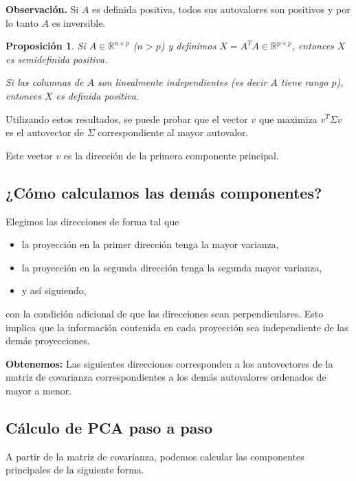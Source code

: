 \documentclass[a4paper]{article}
\newtheorem{prop}{Proposici\'on}
\newcommand{\R}{{\mathbb R}}
\begin{document}
\textbf{Observación.} Si $A$ es definida positiva, todos sus autovalores son positivos y por lo tanto $A$ es inversible.

\begin{prop}
Si $A \in \R^{n \times p}$ ($n > p$) y definimos $X = A^T A \in \R^{p \times p}$, entonces $X$ es semidefinida positiva.

Si las columnas de $A$ son linealmente independientes (es decir $A$ tiene rango $p$), entonces $X$ es definida positiva.
\end{prop}


Utilizando estos resultados, se puede probar que el vector $v$ que maximiza $v^T \Sigma v$ es el autovector de $\Sigma$ correspondiente al mayor autovalor.

Este vector $v$ es la dirección de la primera componente principal.

\subsection{¿Cómo calculamos las demás componentes?}

Elegimos las direcciones de forma tal que
\begin{itemize}
\item la proyección en la primer dirección tenga la mayor varianza,
\item la proyección en la segunda dirección tenga la segunda mayor varianza,
\item y así siguiendo,
\end{itemize}
con la condición adicional de que las direcciones sean perpendiculares. Esto implica que la información contenida en cada proyección sea independiente de las demás proyecciones.

\textbf{Obtenemos:} Las siguientes direcciones corresponden a los autovectores de la matriz de covarianza correspondientes a los demás autovalores ordenados de mayor a menor.

\subsection{Cálculo de PCA paso a paso}

A partir de la matriz de covarianza, podemos calcular las componentes principales de la siguiente forma.
\end{document}

